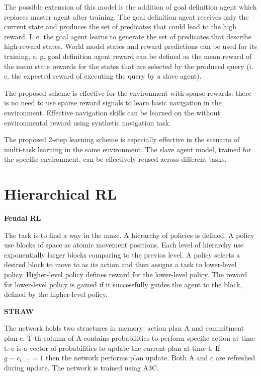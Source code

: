 \documentclass{article}
\begin{document}
The possible extension of this model is the addition of goal definition agent which replaces master agent after training. The goal definition agent receives only the current state and produces the set of predicates that could lead to the high reward. I. e. the goal agent learns to generate the set of predicates that describe high-reward states. World model states and reward predictions can be used for its training, e. g. goal definition agent reward can be defined as the mean reward of the mean state rewards for the states that are selected by the produced query (i. e. the expected reward of executing the query by a slave agent).

The proposed scheme is effective for the environment with sparse rewards: there is no need to use sparse reward signals to learn basic navigation in the environment. Effective navigation skills can be learned on the without environmental reward using synthetic navigation task.

The proposed 2-step learning scheme is especially effective in the scenario of multi-task learning in the same environment. The slave agent model, trained for the specific environment, can be effectively reused across different tasks.

\section{Hierarchical RL}

\textbf{Feudal RL}~\cite{Dayan1992FeudalRL}

The task is to find a way in the maze. A hierarchy of policies is defined. A policy use blocks of space as atomic movement positions. Each level of hierarchy use exponentially larger blocks comparing to the previos level. A policy selects a desired block to move to as its action and then assigns a task to lower-level policy. Higher-level policy defines reward for the lower-level policy. The reward for lower-level policy is gained if it successfully guides the agent to the block, defined by the higher-level policy.

\textbf{STRAW}~\cite{Vezhnevets2016StrategicAW}

The network holds two structures in memory: action plan A and commitment plan c. T-th column of A contains probabilities to perform specific action at time t. c is a vector of probabilities to update the current plan at time t. If $g \sim c_{t-1} = 1$ then the network performs plan update. Both A and c are refreshed during update. The network is trained using A3C.
\end{document}
